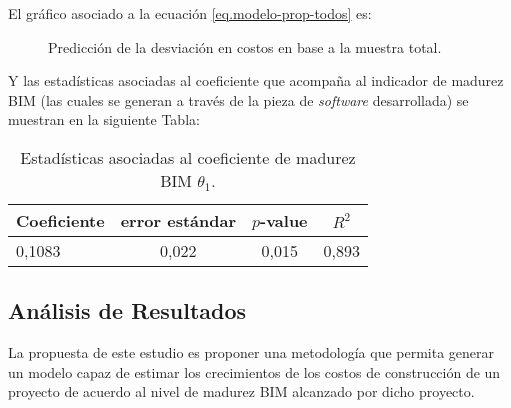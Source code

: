 El gráfico asociado a la ecuación \eqref{eq.modelo-prop-todos} es:

\begin{figure}[H]
    \centering
    \caption{Predicción de la desviación en costos en base a la muestra total.}
\end{figure}

Y las estadísticas asociadas al coeficiente que acompaña al indicador de madurez BIM (las cuales se generan a través de la pieza de \emph{software} desarrollada) se muestran en la siguiente Tabla:

\begin{table}[H]
    \centering
    \label{tab.est}
    \caption{Estadísticas asociadas al coeficiente de madurez BIM $\theta_1$.}
    \begin{tabular}{lccc}
        \toprule
        Coeficiente & error estándar & $p$-value & $R^2$\\
        \midrule
        0,1083      & 0,022          & 0,015     & 0,893\\  
        \bottomrule        
    \end{tabular}
\end{table}

\subsection{Análisis de Resultados}

La propuesta de este estudio es proponer una metodología que permita generar un modelo capaz de estimar los crecimientos de los costos de construcción de un proyecto de acuerdo al nivel de madurez BIM alcanzado por dicho proyecto. 

